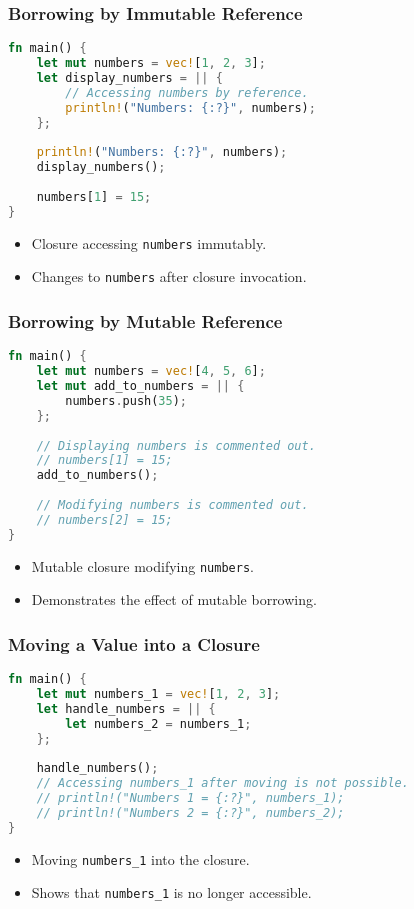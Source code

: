 \documentclass[aspectratio=169, table]{beamer}
\begin{document}
\begin{frame}[fragile]
\frametitle{Borrowing by Immutable Reference}
\begin{lstlisting}[language=Rust]
fn main() {
	let mut numbers = vec![1, 2, 3];
	let display_numbers = || {
		// Accessing numbers by reference.
		println!("Numbers: {:?}", numbers);
	};
	
	println!("Numbers: {:?}", numbers);
	display_numbers();
	
	numbers[1] = 15;
}
\end{lstlisting}
\begin{itemize}
\item Closure accessing \texttt{numbers} immutably.
\item Changes to \texttt{numbers} after closure invocation.
\end{itemize}
\end{frame}

\begin{frame}[fragile]
\frametitle{Borrowing by Mutable Reference}
\begin{lstlisting}[language=Rust]
fn main() {
	let mut numbers = vec![4, 5, 6];
	let mut add_to_numbers = || {
		numbers.push(35);
	};
	
	// Displaying numbers is commented out.
	// numbers[1] = 15;
	add_to_numbers();
	
	// Modifying numbers is commented out.
	// numbers[2] = 15;
}
\end{lstlisting}
\begin{itemize}
\item Mutable closure modifying \texttt{numbers}.
\item Demonstrates the effect of mutable borrowing.
\end{itemize}
\end{frame}

\begin{frame}[fragile]
\frametitle{Moving a Value into a Closure}
\begin{lstlisting}[language=Rust]
fn main() {
	let mut numbers_1 = vec![1, 2, 3];
	let handle_numbers = || {
		let numbers_2 = numbers_1;
	};
	
	handle_numbers();
	// Accessing numbers_1 after moving is not possible.
	// println!("Numbers 1 = {:?}", numbers_1);
	// println!("Numbers 2 = {:?}", numbers_2);
}
\end{lstlisting}
\begin{itemize}
\item Moving \texttt{numbers\_1} into the closure.
\item Shows that \texttt{numbers\_1} is no longer accessible.
\end{itemize}
\end{frame}
\end{document}

